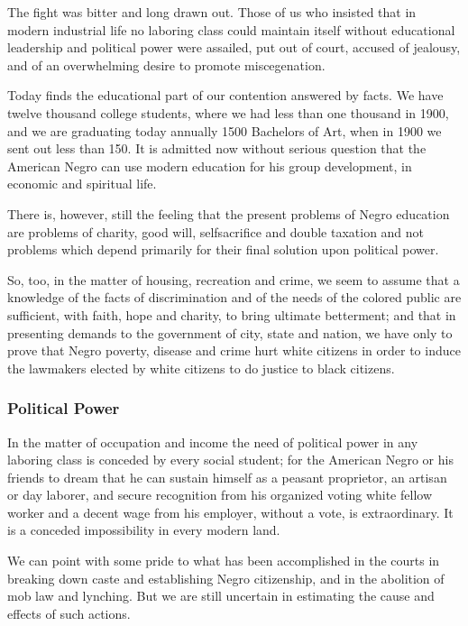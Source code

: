 \documentclass[letterpaper,10pt,english]{jupyterBook}
\begin{document}
\sphinxAtStartPar
The fight was bitter and long drawn out. Those of us who insisted that in modern industrial life no laboring class could maintain itself without educational leadership and political power were assailed, put out of court, accused of jealousy, and of an overwhelming desire to promote miscegenation.

\sphinxAtStartPar
Today finds the educational part of our contention answered by facts. We have twelve thousand college students, where we had less than one thousand in 1900, and we are graduating today annually 1500 Bachelors of Art, when in 1900 we sent out less than 150. It is admitted now without serious question that the American Negro can use modern education for his group development, in economic and spiritual life.

\sphinxAtStartPar
There is, however, still the feeling that the present problems of Negro education are problems of charity, good will, self\sphinxhyphen{}sacrifice and double taxation and not problems which depend primarily for their final solution upon political power.

\sphinxAtStartPar
So, too, in the matter of housing, recreation and crime, we seem to assume that a knowledge of the facts of discrimination and of the needs of the colored public are sufficient, with faith, hope and charity, to bring ultimate betterment; and that in presenting demands to the government of city, state and nation, we have only to prove that Negro poverty, disease and crime hurt white citizens in order to induce the lawmakers elected by white citizens to do justice to black citizens.


\subsubsection{Political Power}
\label{\detokenize{Volumes/36/05/negro_citizen:political-power}}
\sphinxAtStartPar
In the matter of occupation and income the need of political power in any laboring class is conceded by every social student; for the American Negro or his friends to dream that he can sustain himself as a peasant proprietor, an artisan or day laborer, and secure recognition from his organized voting white fellow worker and a decent wage from his employer, without a vote, is extraordinary. It is a conceded impossibility in every modern land.

\sphinxAtStartPar
We can point with some pride to what has been accomplished in the courts in breaking down caste and establishing Negro citizenship, and in the abolition of mob law and lynching. But we are still uncertain in estimating the cause and effects of such actions.
\end{document}
